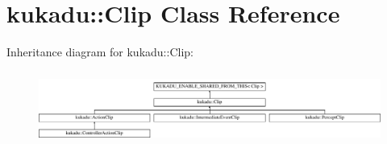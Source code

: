 \hypertarget{classkukadu_1_1Clip}{\section{kukadu\-:\-:Clip Class Reference}
\label{classkukadu_1_1Clip}
}
Inheritance diagram for kukadu\-:\-:Clip\-:\begin{figure}[H]
\begin{center}
\leavevmode
\includegraphics[height=2.424242cm]{classkukadu_1_1Clip}
\end{center}
\end{figure}
